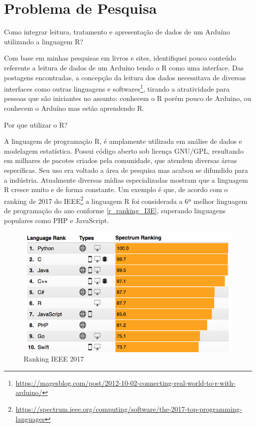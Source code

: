 \chapter[Problema de Pesquisa]{Problema de Pesquisa}

Como integrar leitura, tratamento e apresentação de dados de um Arduíno 
utilizando a linguagem R? 

Com base em minhas pesquisas em livros e sites, identifiquei 
pouco conteúdo referente a leitura de dados de um Arduíno tendo o R como uma
interface. Das postagens encontradas, a concepção da leitura dos dados 
necessitava de diversas 
interfaces
como outras linguagens e softwares\footnote{\url{https://magesblog.com/post/2012-10-02-connecting-real-world-to-r-with-arduino/}}, tirando a atratividade para pessoas que são 
iniciantes no assunto: conhecem o R porém pouco de Arduino, ou conhecem o 
Arduíno mas estão aprendendo R.

Por que utilizar o R?

A linguagem de programação R, é amplamente utilizada em análise de dados e modelagem estatística. Possui 
código aberto sob licença GNU/GPL, resultando em milhares de pacotes criados 
pela comunidade, que atendem diversas áreas específicas. Seu uso era voltado 
a área de pesquisa mas acabou se difundido para a indústria. Atualmente 
diversas mídias especializadas mostram que a linguagem R cresce muito e de 
forma constante. Um exemplo é que, de acordo com o ranking de 2017 do 
IEEE\footnote{\url{https://spectrum.ieee.org/computing/software/the-2017-top-programming-languages}}
a linguagem R foi considerada a 6ª melhor linguagem de programação do ano conforme 
\autoref{r_ranking_I3E}, superando linguagens populares como PHP e 
JavaScript.

\begin{figure}[htb]
 \caption{\label{r_ranking_I3E} Ranking IEEE 2017}
 \begin{center}
  \includegraphics[scale = 0.4]{img/r_ranking_I3E.jpeg}
 \end{center}
\end{figure}

